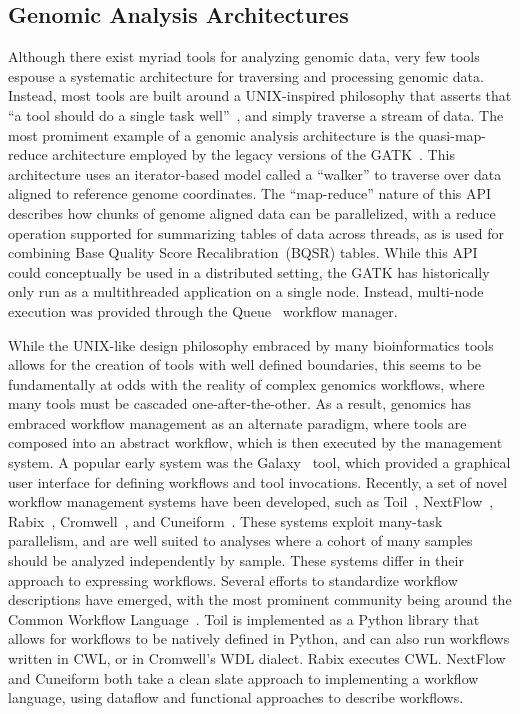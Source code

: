 \documentclass[phd]{ucbthesis}
\begin{document}
\subsection{Genomic Analysis Architectures}
\label{sec:genomic-architectures}

Although there exist myriad tools for analyzing genomic data, very few tools
espouse a systematic architecture for traversing and processing genomic data.
Instead, most tools are built around a UNIX-inspired philosophy that asserts
that ``a tool should do a single task well''~\cite{rodriguez11}, and simply
traverse a stream of data. The most promiment example of a genomic analysis
architecture is the quasi-map-reduce architecture employed by the legacy
versions of the GATK~\cite{mckenna10}. This architecture uses an iterator-based
model called a ``walker'' to traverse over data aligned to reference genome
coordinates. The ``map-reduce'' nature of this API describes how chunks of
genome aligned data can be parallelized, with a reduce operation supported
for summarizing tables of data across threads, as is used for combining
Base Quality Score Recalibration~(BQSR) tables. While this API could
conceptually be used in a distributed setting, the GATK has historically
only run as a multithreaded application on a single node. Instead,
multi-node execution was provided through the {Queue}~\cite{depristo11}
workflow manager.

While the UNIX-like design philosophy embraced by many bioinformatics tools
allows for the creation of tools with well defined boundaries, this seems to be
fundamentally at odds with the reality of complex genomics workflows, where many
tools must be cascaded one-after-the-other. As a result, genomics has embraced
workflow management as an alternate paradigm, where tools are composed into an
abstract workflow, which is then executed by the management system. A popular
early system was the {Galaxy}~\cite{goecks10} tool, which provided a
graphical user interface for defining workflows and tool invocations. Recently,
a set of novel workflow management systems have been developed, such as
{Toil}~\cite{vivian17}, {NextFlow}~\cite{ditommaso17},
{Rabix}~\cite{kaushik16}, {Cromwell}~\cite{cromwell},
and {Cuneiform}~\cite{brandt15}. These systems exploit many-task
parallelism, and are well suited to analyses where a cohort of many samples
should be analyzed independently by sample. These systems differ in their
approach to expressing workflows. Several efforts to standardize workflow
descriptions have emerged, with the most prominent community being around the
{Common Workflow Language}~\cite{cwl}. {Toil} is implemented as
a Python library that allows for workflows to be natively defined in Python,
and can also run workflows written in CWL, or in {Cromwell}'s WDL
dialect. {Rabix} executes CWL. {NextFlow} and {Cuneiform}
both take a clean slate approach to implementing a workflow language, using
dataflow and functional approaches to describe workflows.
\end{document}
